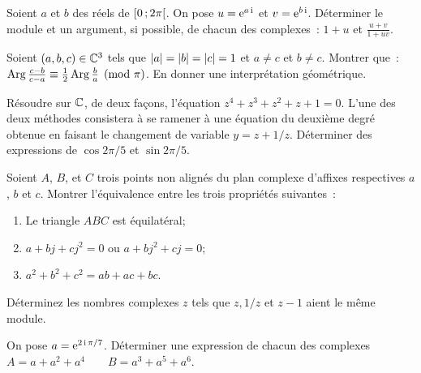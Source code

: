 \begin{exercice}
  Soient \(a\) et \(b\) des réels de \(\left[ 0 \, ;  2\pi \right[\). On pose \(u = 
  \operatorname{e}^{a\operatorname{i}}\) et \(v = \operatorname{e}^{b\operatorname{i}}\). Déterminer le module et un argument, si 
  possible, de chacun des complexes~: \(1 + u\) et \(\frac{u + v}{1 + uv}\).
\end{exercice}

\begin{exercice}
  Soient \((a, b, c) \in \mathbb{C}^3\) tels que \(\left\lvert a\right\rvert = \left\lvert b\right\rvert = \left\lvert c\right\rvert = 1\) 
  et \(a \neq c\) et \(b \neq c\). Montrer que~:\(\operatorname{Arg} \frac{c-b}{c-a} \equiv 
  \frac{1}{2} \operatorname{Arg} \frac{b}{a} \pmod \pi\). En donner une interprétation 
  géométrique.
\end{exercice}

\begin{exercice}
  Résoudre sur \(\mathbb{C}\), de deux façons, l'équation \(z^4 + z^3 + z^2 + z + 1 = 
  0\). L'une des deux méthodes consistera à se ramener à une équation du 
  deuxième degré obtenue en faisant le changement de variable \(y = z + 1/z\).  
  Déterminer des expressions de \(\cos 2\pi/5\) et \(\sin 2\pi/5\).
\end{exercice}

\begin{exercice}
  Soient \(A\), \(B\), et \(C\) trois points non alignés du plan complexe 
  d'affixes respectives \(a\), \(b\) et \(c\). Montrer l'équivalence entre les 
  trois propriétés suivantes~:
  \begin{enumerate}
    \item Le triangle \(ABC\) est équilatéral;
    \item \(a + bj + cj^2 = 0\) ou \(a + bj^2 + cj = 0\);
    \item \(a^2 + b^2 + c^2 = ab + ac + bc\).
  \end{enumerate}
\end{exercice}

\begin{exercice}
  Déterminez les nombres complexes \(z\) tels que \(z, 1/z\) et \(z-1\) aient 
  le même module.
\end{exercice}

\begin{exercice}
  On pose \(a = \operatorname{e}^{2\operatorname{i}\pi/7}\). Déterminer une expression de chacun des 
  complexes \(A = a + a^2 + a^4 \qquad B = a^3 + a^5 + a^6\).
\end{exercice}


